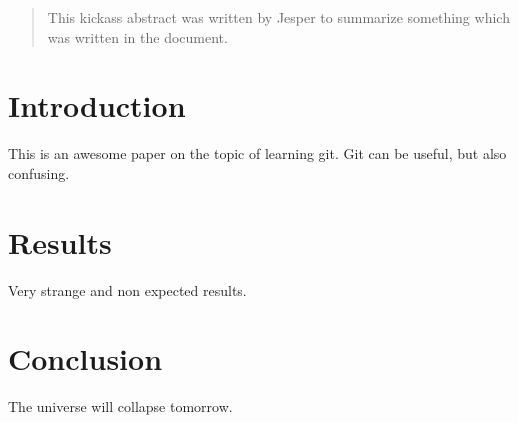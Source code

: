 \documentclass{article}
\begin{document}
\begin{abstract}
This kickass abstract was written by Jesper to summarize something which was written in the document.
\end{abstract}

\section{Introduction}

This is an awesome paper on the topic of learning git. Git can be useful, but also confusing.

\section{Results}

Very strange and non expected results.  

\section{Conclusion}

The universe will collapse tomorrow.
\end{document}
